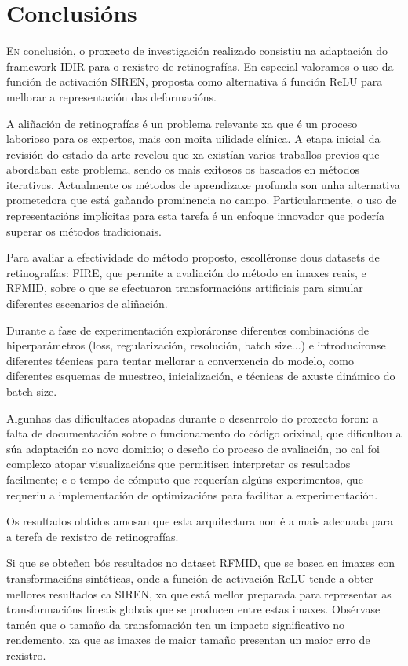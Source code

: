 \chapter{Conclusións}
\label{chap:Conclusións}

\lettrine{E}{n} conclusión, o proxecto de investigación realizado consistiu na adaptación do framework IDIR para o rexistro de retinografías.
En especial valoramos o uso da función de activación SIREN, proposta como alternativa á función ReLU para mellorar a representación das deformacións.

A aliñación de retinografías é un problema relevante xa que é un proceso laborioso para os expertos, mais con moita uilidade clínica.
A etapa inicial da revisión do estado da arte revelou que xa existían varios traballos previos que abordaban este problema, sendo os mais exitosos os baseados en métodos iterativos.
Actualmente os métodos de aprendizaxe profunda son unha alternativa prometedora que está gañando prominencia no campo. Particularmente, o uso de representacións implícitas para esta tarefa é un enfoque innovador que podería superar os métodos tradicionais. 

Para avaliar a efectividade do método proposto, escolléronse dous datasets de retinografías: FIRE, que permite a avaliación do método en imaxes reais, e RFMID, sobre o que se efectuaron transformacións artificiais para simular diferentes escenarios de aliñación.

Durante a fase de experimentación exploráronse diferentes combinacións de hiperparámetros (loss, regularización, resolución, batch size...) e introducíronse diferentes técnicas para tentar mellorar a converxencia do modelo, como diferentes esquemas de muestreo, inicialización, e técnicas de axuste dinámico do batch size.

Algunhas das dificultades atopadas durante o desenrrolo do proxecto foron: a falta de documentación sobre o funcionamento do código orixinal, que dificultou a súa adaptación ao novo dominio; o deseño do proceso de avaliación, no cal foi complexo atopar visualizacións que permitisen interpretar os resultados facilmente; e o tempo de cómputo que requerían algúns experimentos, que requeriu a implementación de optimizacións para facilitar a experimentación.

Os resultados obtidos amosan que esta arquitectura non é a mais adecuada para a terefa de rexistro de retinografías.

Si que se obteñen bós resultados no dataset RFMID, que se basea en imaxes con transformacións sintéticas, onde a función de activación ReLU tende a obter mellores resultados ca SIREN, xa que está mellor preparada para representar as transformacións lineais globais que se producen entre estas imaxes.
Obsérvase tamén que o tamaño da transfomación ten un impacto significativo no rendemento, xa que as imaxes de maior tamaño presentan un maior erro de rexistro.

